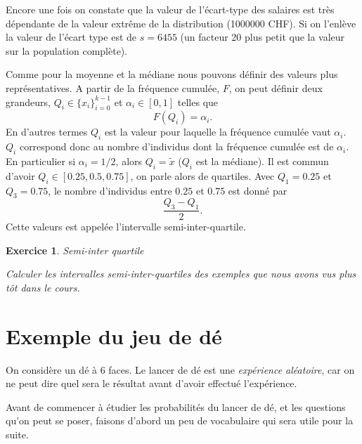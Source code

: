 \documentclass[a4paper,12pt]{book}
\newtheorem*{exercice}{Exercice}
\begin{document}
Encore une fois on constate que la valeur de l'écart-type des salaires est très dépendante de la valeur extrême de la distribution (1000000 CHF). 
Si on l'enlève la valeur de l'écart type est de $s=6455$ (un facteur 20 plus petit que la valeur sur la population complète).

Comme pour la moyenne et la médiane nous pouvons définir des valeurs plus représentatives. A partir de la fréquence cumulée, $F$,
on peut définir deux grandeurs, $Q_i\in\{x_i\}_{i=0}^{k-1}$ et $\alpha_i\in[0,1]$ telles que
\begin{equation}
 F(Q_i)=\alpha_i.
\end{equation}
En d'autres termes $Q_i$ est la valeur pour laquelle la fréquence cumulée vaut $\alpha_i$. $Q_i$ correspond donc au nombre d'individus dont la fréquence cumulée est de $\alpha_i$. 
En particulier si $\alpha_i=1/2$, alors $Q_i=\tilde{x}$ ($Q_i$ est la médiane). Il est commun d'avoir $Q_i\in[0.25,0.5,0.75]$, on parle alors de quartiles. Avec $Q_1=0.25$ et $Q_3=0.75$, 
le nombre d'individus entre $0.25$ et $0.75$ est donné par
\begin{equation}
 \frac{Q_3-Q_1}{2}.
\end{equation}
Cette valeurs est appelée l'intervalle semi-inter-quartile.
\begin{exercice}{Semi-inter quartile}

Calculer les intervalles semi-inter-quartiles des exemples que nous avons vus plus tôt dans le cours.
 
\end{exercice}

\section{Exemple du jeu de dé}

On considère un dé à 6 faces. Le lancer de dé est une \textit{expérience aléatoire}, car
on ne peut dire quel sera le résultat avant d'avoir effectué l'expérience. 

Avant de commencer à étudier les probabilités du lancer de dé, et les questions qu'on peut se poser, faisons d'abord un peu de vocabulaire
qui sera utile pour la suite.
\end{document}
